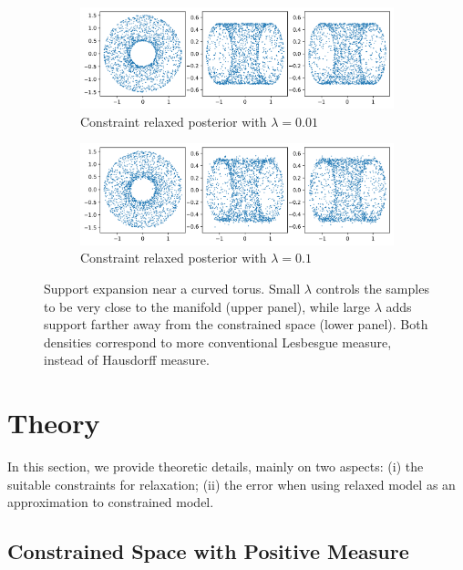 \documentclass[10pt,fleqn]{article}
\DeclareMathOperator{\1}{\mathbbm{1}} \DeclareMathOperator{\bigO}{\mc O}
\begin{document}
\begin{figure}[H]
\begin{subfigure}[b]{1\textwidth}
 \includegraphics[width=1\textwidth]{torus_001.png}
 \caption{Constraint relaxed posterior with $\lambda
 = 0.01$}
\end{subfigure}
\begin{subfigure}[b]{1\textwidth}
 \includegraphics[width=1\textwidth]{torus_005.png}
 \caption{Constraint relaxed posterior with $\lambda
 = 0.1$}
\end{subfigure}
 \caption{Support expansion near a curved torus. Small $\lambda$ controls the samples to be very close to the manifold (upper panel), while large $\lambda$ adds support farther away from the constrained space (lower panel). Both densities correspond to more conventional Lesbesgue measure, instead of Hausdorff measure.
 \label{fig:torus}}
\end{figure}




\section{Theory}

In this section, we provide theoretic details, mainly on two aspects: (i)
the suitable constraints for relaxation; (ii) the error when using relaxed
model as an approximation to constrained model.

\subsection{Constrained
Space with Positive Measure } \label{SEC:Positive_measure_theory}
\end{document}
